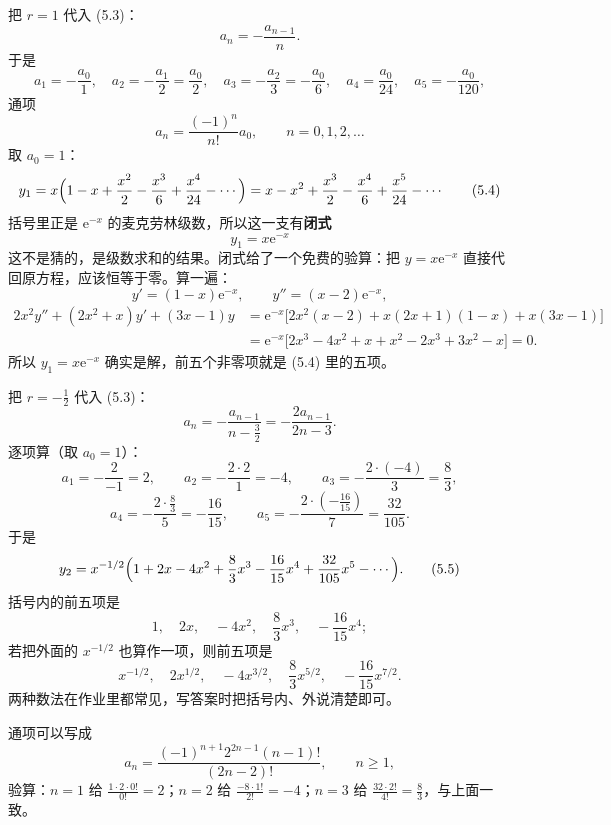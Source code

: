 \documentclass[11pt]{ctexart}
\newcommand{\ee}{\mathrm{e}}
\begin{document}


把 $r=1$ 代入 (5.3)：
\[
a_n=-\frac{a_{n-1}}{n}.
\]
于是
\[
a_1=-\frac{a_0}{1},\quad
a_2=-\frac{a_1}{2}=\frac{a_0}{2},\quad
a_3=-\frac{a_2}{3}=-\frac{a_0}{6},\quad
a_4=\frac{a_0}{24},\quad
a_5=-\frac{a_0}{120},
\]
通项
\[
a_n=\frac{(-1)^n}{n!}a_0,\qquad n=0,1,2,\dots
\]
取 $a_0=1$：
\[
y_1=x\Bigl(1-x+\frac{x^2}{2}-\frac{x^3}{6}+\frac{x^4}{24}-\cdots\Bigr)
=x-x^2+\frac{x^3}{2}-\frac{x^4}{6}+\frac{x^5}{24}-\cdots \tag{5.4}
\]
括号里正是 $\ee^{-x}$ 的麦克劳林级数，所以这一支有\textbf{闭式}
\[
\boxed{\,y_1=x\ee^{-x}\,}
\]
这不是猜的，是级数求和的结果。闭式给了一个免费的验算：把 $y=x\ee^{-x}$ 直接代回原方程，应该恒等于零。算一遍：
\[
y'=(1-x)\ee^{-x},\qquad y''=(x-2)\ee^{-x},
\]
\begin{align*}
2x^2y''+(2x^2+x)y'+(3x-1)y
&=\ee^{-x}\bigl[2x^2(x-2)+x(2x+1)(1-x)+x(3x-1)\bigr]\\
&=\ee^{-x}\bigl[2x^3-4x^2+x+x^2-2x^3+3x^2-x\bigr]=0 .
\end{align*}
所以 $y_1=x\ee^{-x}$ 确实是解，前五个非零项就是 (5.4) 里的五项。


把 $r=-\frac12$ 代入 (5.3)：
\[
a_n=-\frac{a_{n-1}}{n-\frac32}=-\frac{2a_{n-1}}{2n-3}.
\]
逐项算（取 $a_0=1$）：
\[
a_1=-\frac{2}{-1}=2,\qquad
a_2=-\frac{2\cdot2}{1}=-4,\qquad
a_3=-\frac{2\cdot(-4)}{3}=\frac83,
\]
\[
a_4=-\frac{2\cdot\frac83}{5}=-\frac{16}{15},\qquad
a_5=-\frac{2\cdot(-\frac{16}{15})}{7}=\frac{32}{105}.
\]
于是
\[
y_2=x^{-1/2}\Bigl(1+2x-4x^2+\frac83x^3-\frac{16}{15}x^4+\frac{32}{105}x^5-\cdots\Bigr). \tag{5.5}
\]
括号内的前五项是
\[
1,\quad 2x,\quad -4x^2,\quad \frac83x^3,\quad -\frac{16}{15}x^4 ;
\]
若把外面的 $x^{-1/2}$ 也算作一项，则前五项是
\[
x^{-1/2},\quad 2x^{1/2},\quad -4x^{3/2},\quad \frac83x^{5/2},\quad -\frac{16}{15}x^{7/2}.
\]
两种数法在作业里都常见，写答案时把括号内、外说清楚即可。

通项可以写成
\[
a_n=\frac{(-1)^{n+1}2^{2n-1}(n-1)!}{(2n-2)!},\qquad n\geq1,
\]
验算：$n=1$ 给 $\frac{1\cdot2\cdot0!}{0!}=2$；$n=2$ 给 $\frac{-8\cdot1!}{2!}=-4$；$n=3$ 给 $\frac{32\cdot2!}{4!}=\frac83$，与上面一致。

\end{document}
